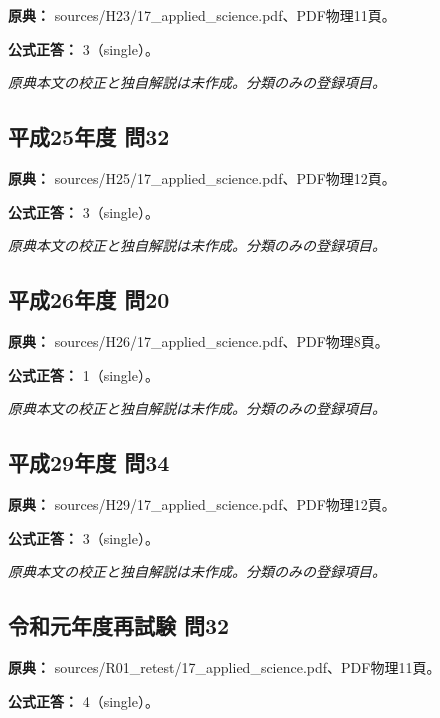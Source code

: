 \noindent\textbf{原典：} sources/H23/17\_applied\_science.pdf、PDF物理11頁。

\textbf{公式正答：} 3（single）。

\par\textit{原典本文の校正と独自解説は未作成。分類のみの登録項目。}

\subsection{平成25年度 問32}
\label{q:h25-reg-applied-32}

\noindent\textbf{原典：} sources/H25/17\_applied\_science.pdf、PDF物理12頁。

\textbf{公式正答：} 3（single）。

\par\textit{原典本文の校正と独自解説は未作成。分類のみの登録項目。}

\subsection{平成26年度 問20}
\label{q:h26-reg-applied-20}

\noindent\textbf{原典：} sources/H26/17\_applied\_science.pdf、PDF物理8頁。

\textbf{公式正答：} 1（single）。

\par\textit{原典本文の校正と独自解説は未作成。分類のみの登録項目。}

\subsection{平成29年度 問34}
\label{q:h29-reg-applied-34}

\noindent\textbf{原典：} sources/H29/17\_applied\_science.pdf、PDF物理12頁。

\textbf{公式正答：} 3（single）。

\par\textit{原典本文の校正と独自解説は未作成。分類のみの登録項目。}

\subsection{令和元年度再試験 問32}
\label{q:r01-ret-applied-32}

\noindent\textbf{原典：} sources/R01\_retest/17\_applied\_science.pdf、PDF物理11頁。

\textbf{公式正答：} 4（single）。

